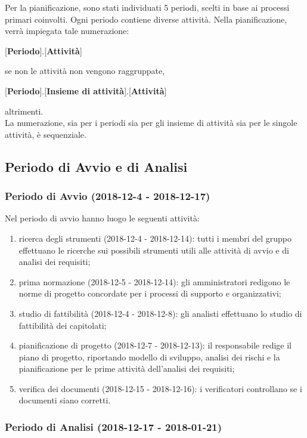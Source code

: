 Per la pianificazione, sono stati individuati 5 periodi, scelti in base ai processi primari coinvolti. Ogni periodo contiene diverse attività. Nella pianificazione, verrà impiegata tale numerazione:
\begin{center}
	[\textbf{Periodo}].[\textbf{Attività}]
\end{center}
se non le attività non vengono raggruppate,
\begin{center}
	[\textbf{Periodo}].[\textbf{Insieme di attività}].[\textbf{Attività}]
\end{center}
altrimenti.\\
La numerazione, sia per i periodi sia per gli insieme di attività sia per le singole attività, è sequenziale.

\subsection{Periodo di Avvio e di Analisi}
	\subsubsection{Periodo di Avvio (2018-12-4 - 2018-12-17)}
		Nel periodo di avvio hanno luogo le seguenti attività:
		\begin{enumerate}[label = 1.\arabic*)]
			\item ricerca degli strumenti (2018-12-4 - 2018-12-14): tutti i membri del gruppo effettuano le ricerche sui possibili strumenti utili alle attività di avvio e di analisi dei requisiti;
			\item prima normazione (2018-12-5 - 2018-12-14): gli amministratori redigono le norme di progetto concordate per i processi di supporto e organizzativi;
			\item studio di fattibilità (2018-12-4 - 2018-12-8): gli analisti effettuano lo studio di fattibilità dei capitolati;
			\item pianificazione di progetto (2018-12-7 - 2018-12-13): il responsabile redige il piano di progetto, riportando modello di sviluppo, analisi dei rischi e la pianificazione per le prime attività dell'analisi dei requisiti;
			\item verifica dei documenti (2018-12-15 - 2018-12-16): i verificatori controllano se i documenti siano corretti.
		\end{enumerate}
		
	\subsubsection{Periodo di Analisi (2018-12-17 - 2018-01-21)}	
